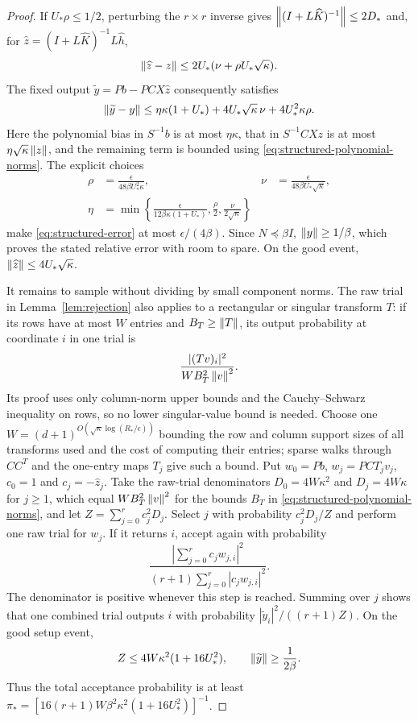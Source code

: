 \begin{proof}
If $U_*\rho\leq1/2$, perturbing the $r\times r$ inverse gives
$\left\lVert(I+L\widehat K)^{-1}\right\rVert\leq2D_*$ and, for
$\widehat z=(I+L\widehat K)^{-1}L\widehat h$,
\[
 \left\lVert\widehat z-z\right\rVert\leq
 2U_*(\nu+\rho U_*\sqrt\kappa).
\]
The fixed output $\widetilde y=Pb-PCX\widehat z$ consequently satisfies
\begin{equation}\label{eq:structured-error}
 \left\lVert\widetilde y-y\right\rVert\leq
 \eta\kappa(1+U_*)+4U_*\sqrt\kappa\,\nu
                   +4U_*^2\kappa\rho.
\end{equation}
Here the polynomial bias in $S^{-1}b$ is at most
$\eta\kappa$, that in $S^{-1}CXz$ is at most
$\eta\sqrt\kappa\left\lVert z\right\rVert$, and the remaining term is bounded using
\eqref{eq:structured-polynomial-norms}. The explicit choices
\begin{align*}
 \rho&=\frac{\epsilon}{48\beta U_*^2\kappa},&
 \nu&=\frac{\epsilon}{48\beta U_*\sqrt\kappa},\\
 \eta&=\min\left\{\frac{\epsilon}{12\beta\kappa(1+U_*)},
                         \frac\rho2,\frac\nu{2\sqrt\kappa}\right\}
\end{align*}
make \eqref{eq:structured-error} at most $\epsilon/(4\beta)$.
Since $N\preceq\beta I$, $\left\lVert y\right\rVert\geq1/\beta$, which proves the
stated relative error with room to spare. On the good event,
$\left\lVert\widehat z\right\rVert\leq4U_*\sqrt\kappa$.

It remains to sample without dividing by small component norms. The raw
trial in Lemma~\ref{lem:rejection} also applies to a rectangular or singular
transform $T$: if its rows have at most $W$ entries and $B_T\geq\left\lVert T\right\rVert$,
its output probability at coordinate $i$ in one trial is
\begin{equation}\label{eq:raw-rectangular}
                  \frac{|(Tv)_i|^2}{WB_T^2\left\lVert v\right\rVert^2}.
\end{equation}
Its proof uses only column-norm upper bounds and the Cauchy--Schwarz
inequality on rows, so no lower singular-value bound is needed.
Choose one $W=(d+1)^{O(\sqrt\kappa\log(R_*/\epsilon))}$ bounding
the row and column support sizes of all transforms used and the cost of
computing their entries; sparse walks through $CC^T$ and the one-entry
maps $T_j$ give such a bound. Put $w_0=Pb$, $w_j=PC T_jv_j$, $c_0=1$ and
$c_j=-\widehat z_j$. Take the raw-trial denominators $D_0=4W\kappa^2$
and $D_j=4W\kappa$ for $j\geq1$, which equal $WB_T^2\left\lVert v\right\rVert^2$ for the
bounds $B_T$ in \eqref{eq:structured-polynomial-norms}, and let
$Z=\sum_{j=0}^r c_j^2D_j$. Select $j$ with probability $c_j^2D_j/Z$
and perform one raw trial for $w_j$. If it returns $i$, accept again with
probability
\[
 \frac{|\sum_{j=0}^r c_jw_{j,i}|^2}
      {(r+1)\sum_{j=0}^r |c_jw_{j,i}|^2}.
\]
The denominator is positive whenever this step is reached. Summing over
$j$ shows that one combined trial outputs $i$ with probability
$|\widetilde y_i|^2/((r+1)Z)$. On the good setup event,
\[
 Z\leq4W\kappa^2(1+16U_*^2),\qquad
 \left\lVert\widetilde y\right\rVert\geq\frac1{2\beta}.
\]
Thus the total acceptance probability is at least
$\pi_*=[16(r+1)W\beta^2\kappa^2(1+16U_*^2)]^{-1}$.


\end{proof}
